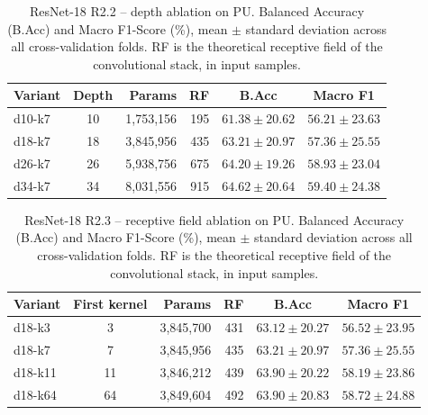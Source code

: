 \begin{table}[ht]
\centering
\caption{ResNet-18 R2.2 -- depth ablation on PU. Balanced Accuracy (B.Acc) and Macro F1-Score (\%), mean $\pm$ standard deviation across all cross-validation folds. RF is the theoretical receptive field of the convolutional stack, in input samples.}
\label{tab:ablation_resnet18_depth_pu}
\begin{tabular}{@{}l c r r c c@{}}
\toprule
\textbf{Variant} & \textbf{Depth} & \textbf{Params} & \textbf{RF} & \textbf{B.Acc} & \textbf{Macro F1} \\ \midrule
d10-k7 & 10 & 1,753,156 & 195 & $61.38 \pm 20.62$ & $56.21 \pm 23.63$ \\
d18-k7 & 18 & 3,845,956 & 435 & $63.21 \pm 20.97$ & $57.36 \pm 25.55$ \\
d26-k7 & 26 & 5,938,756 & 675 & $64.20 \pm 19.26$ & $58.93 \pm 23.04$ \\
d34-k7 & 34 & 8,031,556 & 915 & $64.62 \pm 20.64$ & $59.40 \pm 24.38$ \\
\bottomrule
\end{tabular}
\end{table}

\begin{table}[ht]
\centering
\caption{ResNet-18 R2.3 -- receptive field ablation on PU. Balanced Accuracy (B.Acc) and Macro F1-Score (\%), mean $\pm$ standard deviation across all cross-validation folds. RF is the theoretical receptive field of the convolutional stack, in input samples.}
\label{tab:ablation_resnet18_kernel_pu}
\begin{tabular}{@{}l c r r c c@{}}
\toprule
\textbf{Variant} & \textbf{First kernel} & \textbf{Params} & \textbf{RF} & \textbf{B.Acc} & \textbf{Macro F1} \\ \midrule
d18-k3 & 3 & 3,845,700 & 431 & $63.12 \pm 20.27$ & $56.52 \pm 23.95$ \\
d18-k7 & 7 & 3,845,956 & 435 & $63.21 \pm 20.97$ & $57.36 \pm 25.55$ \\
d18-k11 & 11 & 3,846,212 & 439 & $63.90 \pm 20.22$ & $58.19 \pm 23.86$ \\
d18-k64 & 64 & 3,849,604 & 492 & $63.90 \pm 20.83$ & $58.72 \pm 24.88$ \\
\bottomrule
\end{tabular}
\end{table}

